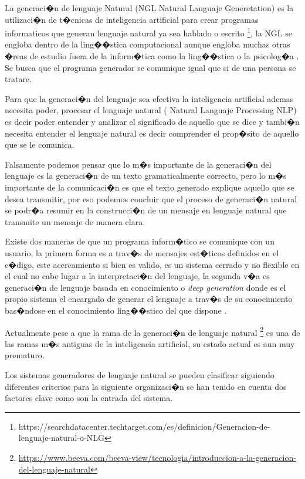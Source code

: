 La generaci�n de lenguaje Natural (NGL Natural Languaje Generetation) es la utilizaci�n de t�cnicas de inteligencia artificial para crear programas informaticos que generan lenguaje natural ya sea hablado o escrito \footnote{https://searchdatacenter.techtarget.com/es/definicion/Generacion-de-lenguaje-natural-o-NLG}, la NGL se engloba dentro de la ling��stica computacional aunque engloba muchas otras �reas de estudio fuera de la inform�tica como la ling��stica o la psicolog�a . Se busca que el programa generador se comunique igual que si de una persona se tratare.\citep{Robert2000} \citep{VICENTE2015}

Para que la generaci�n del lenguaje sea efectiva la inteligencia artificial ademas necesita poder, procesar el lenguaje natural ( Natural Languaje Processing NLP) es decir poder entender y analizar el significado de aquello que se dice y tambi�n necesita entender el lenguaje natural es decir comprender el prop�sito de aquello que se le comunica.

Falsamente podemos pensar que lo m�s importante de la generaci�n del lenguaje es la generaci�n de un texto gramaticalmente correcto, pero lo m�s importante de la comunicaci�n es que el texto generado explique aquello que se desea transmitir, por eso podemos concluir que el proceso de generaci�n natural se podr�a resumir en la construcci�n de un mensaje en lenguaje natural que transmite un mensaje de manera clara.

Existe dos maneras de que un programa inform�tico se comunique con un usuario, la primera forma es a trav�s de mensajes est�ticos definidos en el c�digo, este acercamiento si bien es valido, es un sistema cerrado y no flexible en el cual no cabe lugar a la interpretaci�n del lenguaje, la segunda v�a es generaci�n de  lenguaje basada en conocimiento o \textit{deep generation} donde es el propio sistema el encargado de generar el lenguaje a trav�s de su conocimiento bas�ndose en el conocimiento ling��stico del que dispone \citep{CarlosGarcia2004} .

Actualmente pese a que la rama de la generaci�n de lenguaje natural \footnote{ \url{https://www.beeva.com/beeva-view/tecnologia/introduccion-a-la-generacion-del-lenguaje-natural}} es una de las ramas m�s antiguas de la inteligencia artificial, su estado actual es aun muy prematuro.

Los sistemas generadores de lenguaje natural se pueden clasificar siguiendo diferentes criterios para la siguiente organizaci�n se han tenido en cuenta dos factores clave como son la entrada del sistema.

